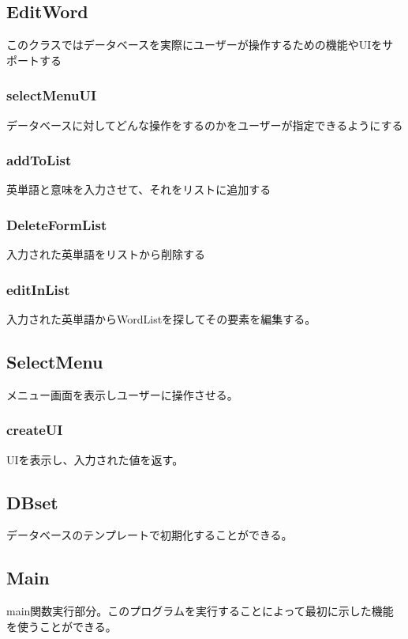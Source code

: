 \documentclass{ltjsarticle}
\begin{document}
\subsection{EditWord}
このクラスではデータベースを実際にユーザーが操作するための機能やUIをサポートする
\subsubsection{selectMenuUI}
データベースに対してどんな操作をするのかをユーザーが指定できるようにする
\subsubsection{addToList}
英単語と意味を入力させて、それをリストに追加する
\subsubsection{DeleteFormList}
入力された英単語をリストから削除する
\subsubsection{editInList}
入力された英単語からWordListを探してその要素を編集する。


\subsection{SelectMenu}
メニュー画面を表示しユーザーに操作させる。
\subsubsection{createUI}
UIを表示し、入力された値を返す。
\subsection{DBset}
データベースのテンプレートで初期化することができる。
\subsection{Main}
main関数実行部分。このプログラムを実行することによって最初に示した機能を使うことができる。
\end{document}
